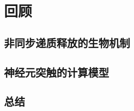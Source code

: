 \chapter{回顾}
\label{chapter:review}

\section{非同步递质释放的生物机制}
\label{section:review:vesicle-release-mechanism}

\section{神经元突触的计算模型}
\label{section:review:neural-computation-model}

\section{总结}
\label{section:review:summary}